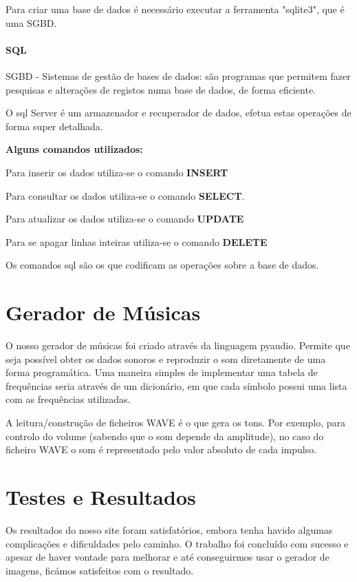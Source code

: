 Para criar uma base de dados é necessário executar a ferramenta "sqlite3", que é uma SGBD.
\subsubsection{SQL}
SGBD - Sistemas de gestão de bases de dados: são programas que permitem fazer pesquisas e alterações de registos numa base de dados, de forma eficiente. 

O \ac{sql} Server é um armazenador e recuperador de dados, efetua estas operações de forma super detalhada. 

\textbf{Alguns comandos utilizados:}

Para inserir os dados utiliza-se o comando \textbf{INSERT}

Para consultar os dados utiliza-se o comando \textbf{SELECT}. 

Para atualizar os dados utiliza-se o comando \textbf{UPDATE}

Para se apagar linhas inteiras utiliza-se o comando \textbf{DELETE}

Os comandos \ac{sql} são os que codificam as operações sobre a base de dados. 


%
\chapter{Gerador de Músicas}
\label{chap.Gerador de Músicas}
O nosso gerador de músicas foi criado através da linguagem pyaudio. Permite que seja possível obter os dados sonoros e reproduzir o som diretamente de uma forma programática. 
Uma maneira simples de implementar uma tabela de frequências seria através de um dicionário, em que cada símbolo possui uma lista com as frequências utilizadas. 

A leitura/construção de ficheiros WAVE é o que gera os tons. Por exemplo, para controlo do volume (sabendo que o som depende da amplitude), no caso do ficheiro WAVE o som é representado pelo valor absoluto de cada impulso. 



%
%
\chapter{Testes e Resultados}
\label{chap.Testes e Resultados}
Os resultados do nosso site foram satisfatórios, embora tenha havido algumas complicações e dificuldades pelo caminho. O trabalho foi concluído com sucesso e apesar de haver vontade para melhorar e até conseguirmos usar o gerador de imagens, ficámos satisfeitos com o resultado. 

